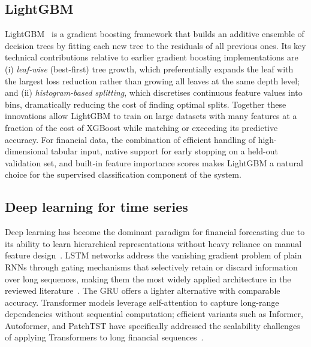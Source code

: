 \subsection{LightGBM}
LightGBM~\cite{ke2017lightgbm} is a gradient boosting framework that builds an additive ensemble of decision trees by fitting each new tree to the residuals of all previous ones. Its key technical contributions relative to earlier gradient boosting implementations are (i) \textit{leaf-wise} (best-first) tree growth, which preferentially expands the leaf with the largest loss reduction rather than growing all leaves at the same depth level; and (ii) \textit{histogram-based splitting}, which discretises continuous feature values into bins, dramatically reducing the cost of finding optimal splits. Together these innovations allow LightGBM to train on large datasets with many features at a fraction of the cost of XGBoost while matching or exceeding its predictive accuracy. For financial data, the combination of efficient handling of high-dimensional tabular input, native support for early stopping on a held-out validation set, and built-in feature importance scores makes LightGBM a natural choice for the supervised classification component of the system.

\subsection{Deep learning for time series}
Deep learning has become the dominant paradigm for financial forecasting
due to its ability to learn hierarchical representations without heavy
reliance on manual feature design~\cite{zhang2024deep}. LSTM networks
address the vanishing gradient problem of plain RNNs through gating
mechanisms that selectively retain or discard information over long
sequences, making them the most widely applied architecture in the
reviewed literature~\cite{sezer2020financial, zhang2024deep}. The GRU
offers a lighter alternative with comparable accuracy. Transformer models leverage self-attention to capture
long-range dependencies without sequential computation; efficient
variants such as Informer, Autoformer, and PatchTST have specifically
addressed the scalability challenges of applying Transformers to long
financial sequences~\cite{zhang2024deep}.

